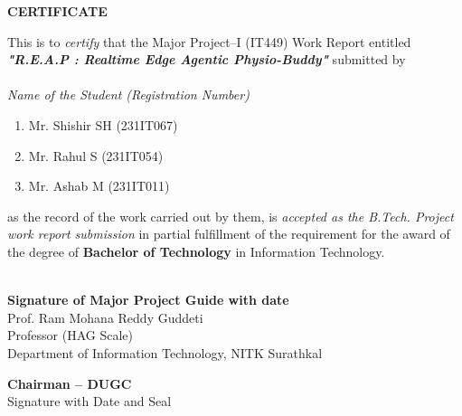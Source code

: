 \documentclass[12pt,a4paper]{report}
\begin{document}
\begin{framed}
    \begin{center}
        \textbf{{\Large CERTIFICATE}}
    \end{center}
    \null
    This is to \textit{certify} that the Major Project--I (IT449) Work Report entitled \textit{\textbf{"R.E.A.P : Realtime Edge Agentic Physio-Buddy"}} submitted by \\
    \\
    \textit{Name of the Student (Registration Number)}
    \begin{enumerate}[label={(\arabic*)}]
        \setlength{\itemsep}{0.3em}
        \item Mr. Shishir SH (231IT067)
        \item Mr. Rahul S (231IT054)
        \item Mr. Ashab M (231IT011)
    \end{enumerate}
    as the record of the work carried out by them, is \textit{accepted as the B.Tech. Project work report submission} in partial fulfillment of the requirement for the award of the degree of \textbf{Bachelor of Technology} in Information Technology.
    \\
    \\
    \begin{minipage}{13.5cm}
        \begin{center} \vspace{1.2cm}	
            \textbf{Signature of Major Project Guide with date}\\[0.2em]
            Prof. Ram Mohana Reddy Guddeti\\
            Professor (HAG Scale) \\
            Department of Information Technology, NITK Surathkal
        \end{center}       
        \vspace{0.6cm}
        \begin{center} \vspace{1.2cm}	
            \textbf{Chairman -- DUGC}\\[0.2em]
            {Signature with Date and Seal}
        \end{center} 
    \end{minipage}
    \\
    \\
    \\
\end{framed}
\thispagestyle{empty}
\clearpage
\end{document}
